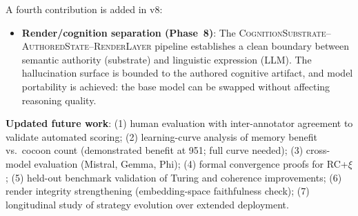 \documentclass[11pt,a4paper]{article}
\begin{document}
A fourth contribution is added in v8:

\begin{itemize}[nosep]
  \item \textbf{Render/cognition separation (Phase~8)}: The
    \textsc{CognitionSubstrate}--\textsc{AuthoredState}--\textsc{RenderLayer}
    pipeline establishes a clean boundary between semantic authority (substrate)
    and linguistic expression (LLM). The hallucination surface is bounded to
    the authored cognitive artifact, and model portability is achieved: the
    base model can be swapped without affecting reasoning quality.
\end{itemize}

\textbf{Updated future work}: (1) human evaluation with inter-annotator
agreement to validate automated scoring; (2) learning-curve analysis of
memory benefit vs.\ cocoon count (demonstrated benefit at 951; full curve
needed); (3) cross-model evaluation (Mistral, Gemma, Phi); (4) formal
convergence proofs for RC+$\xi$; (5) held-out benchmark validation of
Turing and coherence improvements; (6) render integrity strengthening
(embedding-space faithfulness check); (7) longitudinal study of strategy
evolution over extended deployment.
\end{document}

